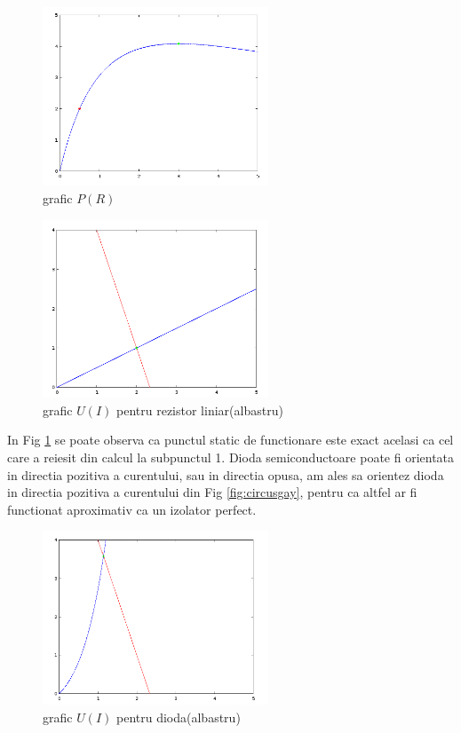 \begin{figure}
\begin{center}
\includegraphics[width=0.6\textwidth]{putere.png}
\caption{grafic $P(R)$}
\end{center}
\end{figure}

\begin{figure}
\begin{center}
\includegraphics[width=0.6\textwidth]{pstatrez.png}
\caption{grafic $U(I)$ pentru rezistor liniar(albastru)}
\label{fig:pstatrez}
\end{center}
\end{figure}

In Fig \ref{fig:pstatrez} se poate observa ca punctul static de functionare este exact acelasi ca cel care a reiesit din calcul la subpunctul 1. Dioda semiconductoare poate fi orientata in directia pozitiva a curentului, sau in directia opusa, am ales sa orientez dioda in directia pozitiva a curentului din Fig \ref{fig:circusgay}, pentru ca altfel ar fi functionat aproximativ ca un izolator perfect.

\begin{figure}
\begin{center}
\includegraphics[width=0.6\textwidth]{pstatdioda.png}
\caption{grafic $U(I)$ pentru dioda(albastru)}
\end{center}
\end{figure}


